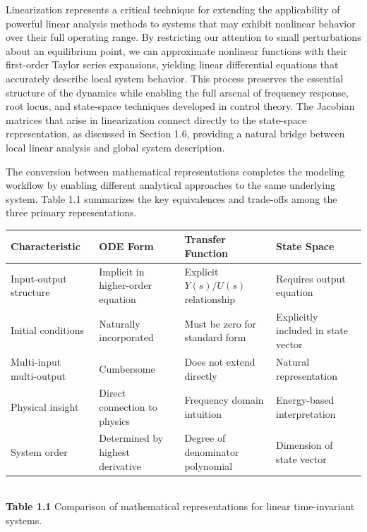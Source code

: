Linearization represents a critical technique for extending the applicability of powerful linear analysis methods to systems that may exhibit nonlinear behavior over their full operating range. By restricting our attention to small perturbations about an equilibrium point, we can approximate nonlinear functions with their first-order Taylor series expansions, yielding linear differential equations that accurately describe local system behavior. This process preserves the essential structure of the dynamics while enabling the full arsenal of frequency response, root locus, and state-space techniques developed in control theory. The Jacobian matrices that arise in linearization connect directly to the state-space representation, as discussed in Section 1.6, providing a natural bridge between local linear analysis and global system description.

The conversion between mathematical representations completes the modeling workflow by enabling different analytical approaches to the same underlying system. Table 1.1 summarizes the key equivalences and trade-offs among the three primary representations.

\begin{table}[htbp]
\centering
\begin{tabular}{|p{}|p{}|p{}|p{}|}
\hline
\textbf{Characteristic} & \textbf{ODE Form} & \textbf{Transfer Function} & \textbf{State Space} \\
\hline
Input-output structure & Implicit in higher-order equation & Explicit $Y(s)/U(s)$ relationship & Requires output equation \\
\hline
Initial conditions & Naturally incorporated & Must be zero for standard form & Explicitly included in state vector \\
\hline
Multi-input multi-output & Cumbersome & Does not extend directly & Natural representation \\
\hline
Physical insight & Direct connection to physics & Frequency domain intuition & Energy-based interpretation \\
\hline
System order & Determined by highest derivative & Degree of denominator polynomial & Dimension of state vector \\
\hline
\end{tabular}
\\[0.5em]
\textcolor{UofSCGarnet}{\textbf{Table 1.1}} Comparison of mathematical representations for linear time-invariant systems.
\end{table}

